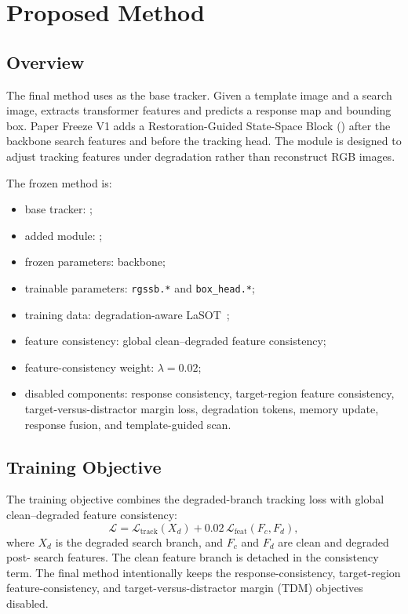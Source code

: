 \section{Proposed Method}

\subsection{Overview}
The final method uses \baseline{} as the base tracker. Given a template image and a search image, \baseline{} extracts transformer features and predicts a response map and bounding box. Paper Freeze V1 adds a Restoration-Guided State-Space Block (\method{}) after the backbone search features and before the tracking head. The module is designed to adjust tracking features under degradation rather than reconstruct RGB images.

The frozen method is:
\begin{itemize}
    \item base tracker: \baseline{};
    \item added module: \method{};
    \item frozen parameters: backbone;
    \item trainable parameters: \texttt{rgssb.*} and \texttt{box\_head.*};
    \item training data: degradation-aware LaSOT~\cite{fan2019lasot};
    \item feature consistency: global clean--degraded feature consistency;
    \item feature-consistency weight: $\lambda=0.02$;
    \item disabled components: response consistency, target-region feature consistency, target-versus-distractor margin loss, degradation tokens, memory update, response fusion, and template-guided scan.
\end{itemize}

\subsection{Training Objective}
The training objective combines the degraded-branch tracking loss with global clean--degraded feature consistency:
\begin{equation}
    \mathcal{L} = \mathcal{L}_{\mathrm{track}}(X_d) + 0.02\,\mathcal{L}_{\mathrm{feat}}(F_c, F_d),
\end{equation}
where $X_d$ is the degraded search branch, and $F_c$ and $F_d$ are clean and degraded post-\method{} search features. The clean feature branch is detached in the consistency term. The final method intentionally keeps the response-consistency, target-region feature-consistency, and target-versus-distractor margin (TDM) objectives disabled.
